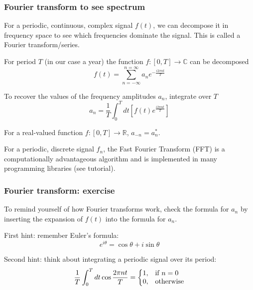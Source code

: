 \documentclass[10pt,aspectratio=169,dvipsnames]{beamer}
\begin{document}
\begin{frame}
  \frametitle{Fourier transform to see spectrum}

  For a periodic, continuous, complex signal $f(t)$, we can decompose it in  frequency space to see which frequencies dominate the signal. This is called a \alert{Fourier transform/series}.

  For period $T$ (in our case a year) the function $f: [0,T] \rightarrow \mathbb{C}$ can be decomposed
  \begin{equation*}
     f(t) = \sum_{n=-\infty}^{n=\infty} a_n e^{-\frac{i2\pi nt}{T}}
  \end{equation*}

  To recover the values of the \alert{frequency amplitudes} $a_n$, integrate over $T$
  \begin{equation*}
     a_n = \frac{1}{T} \int_0^T dt \left[ f(t)  e^{\frac{i2\pi nt}{T}} \right]
  \end{equation*}


  For a real-valued function $f: [0,T] \rightarrow \mathbb{R}$, $a_{-n} = a_n^*$.

  For a periodic, \alert{discrete} signal $f_n$, the \alert{Fast Fourier Transform} (FFT) is a computationally advantageous algorithm and is implemented in many programming libraries (see tutorial).

\end{frame}

\begin{frame}
  \frametitle{Fourier transform: exercise}

  To remind yourself of how Fourier transforms work, check the formula for $a_n$ by inserting the expansion of $f(t)$ into the formula for $a_n$.

  First hint: remember Euler's formula:
  \begin{equation*}
    e^{i\theta} = \cos \theta + i \sin \theta
  \end{equation*}

  Second hint: think about integrating a periodic signal over its period:
  \begin{equation*}
    \frac{1}{T} \int_0^T dt \cos  \frac{2\pi nt}{T} =  \left\{
    \begin{array}{@{}ll@{}}
      1, & \text{if}\ n=0 \\
      0, & \text{otherwise}
        \end{array}\right.
  \end{equation*}



\end{frame}
\end{document}
